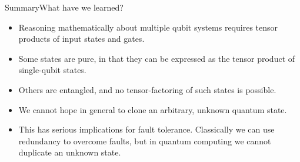 \begin{frame}{Summary}{What have we learned?}

\begin{itemize}
  \item Reasoning mathematically about multiple qubit systems requires tensor products of input states and gates.
  \item Some states are pure, in that they can be expressed as the tensor product of single-qubit states.
  \item Others are entangled, and no  tensor-factoring of such states is possible.
  \item We cannot hope in general to clone an arbitrary, unknown quantum state.
  \item This has serious implications for fault tolerance.  Classically we can use redundancy to overcome faults, but in quantum computing we cannot duplicate an unknown state.
\end{itemize}
    
\end{frame}
